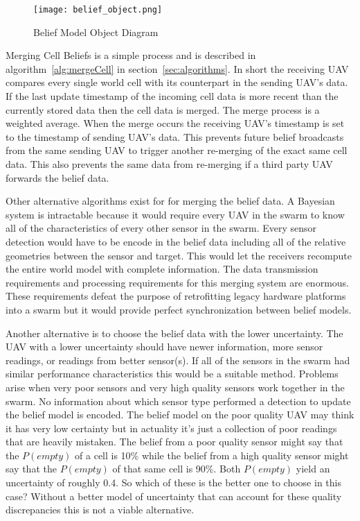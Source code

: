 \begin{figure}[H]
	\centering
	\texttt{[image: belief\_object.png]}
	\caption{Belief Model Object Diagram}
	\label{fig:belief_object}
\end{figure}
\begin{multicols*}{2}
	

Merging Cell Beliefs is a simple process and is described in algorithm~\ref{alg:mergeCell} in section~\ref{sec:algorithms}.   In short the receiving UAV compares every single world cell with its counterpart in the sending UAV's data.  If the last update timestamp of the incoming cell data is more recent than the currently stored data then the cell data is merged.  The merge process is a weighted average.  When the merge occurs the receiving UAV's timestamp is set to the timestamp of sending UAV's data.  This prevents future belief broadcasts from the same sending UAV to trigger another re-merging of the exact same cell data.  This also prevents the same data from re-merging if a third party UAV forwards the belief data. 

Other alternative algorithms exist for for merging the belief data.  A Bayesian system is intractable because it would require every UAV in the swarm to know all of the characteristics of every other sensor in the swarm.  Every sensor detection would have to be encode in the belief data including all of the relative geometries between the sensor and target.  This would let the receivers recompute the entire world model with complete information.  The data transmission requirements and processing requirements for this merging system are enormous.  These requirements defeat the purpose of retrofitting legacy hardware platforms into a swarm but it would provide perfect synchronization between belief models.

Another alternative is to choose the belief data with the lower uncertainty.  The UAV with a lower uncertainty should have newer information, more sensor readings, or readings from better sensor(s).  If all of the sensors in the swarm had similar performance characteristics this would be a suitable method.  Problems arise when very poor sensors and very high quality sensors work together in the swarm.  No information about which sensor type performed a detection to update the belief model is encoded.  The belief model on the poor quality UAV may think it has very low certainty but in actuality it's just a collection of poor readings that are heavily mistaken.  The belief from a poor quality sensor might say that the $P(empty)$ of a cell is 10\% while the belief from a high quality sensor might say that the $P(empty)$ of that same cell is 90\%.  Both $P(empty)$ yield an uncertainty of roughly 0.4.  So which of these is the better one to choose in this case?  Without a better model of uncertainty that can account for these quality discrepancies this is not a viable alternative.


\end{multicols*}
